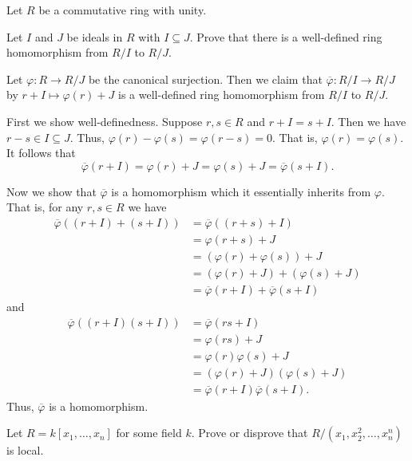 \documentclass[12 pt, letterpaper]{hmcpset}
\begin{document}
Let $R$ be a commutative ring with unity.

\begin{problem}[1.]
	Let $I$ and $J$ be ideals in $R$ with $I \subseteq J$. Prove that there is a well-defined ring homomorphism from $R / I$ to $R / J$.
\end{problem}

\begin{solution}
	Let $\varphi : R \to R / J$ be the canonical surjection. Then we claim that $\overline{\varphi} : R / I \to R / J$ by $r + I \mapsto \varphi(r) + J$ is a well-defined ring homomorphism from $R / I$ to $R / J$. 

	First we show well-definedness. Suppose $r, s \in R$ and $r + I = s + I$. Then we have $r - s \in I \subseteq J$. Thus, $\varphi(r) - \varphi(s) = \varphi(r - s) = 0$. That is, $\varphi(r) = \varphi(s)$. It follows that
	\[
		\overline{\varphi}(r + I) = \varphi(r) + J = \varphi(s) + J = \overline{\varphi}(s + I).
	\]

	Now we show that $\overline{\varphi}$ is a homomorphism which it essentially inherits from $\varphi$. That is, for any $r, s \in R$ we have
	\begin{align*}
		\overline{\varphi}((r + I) + (s + I)) & = \overline{\varphi}((r + s) + I) \\
						      & = \varphi(r + s) + J \\
						      & = (\varphi(r) + \varphi(s)) + J \\
						      & = (\varphi(r) + J) + (\varphi(s) + J) \\
						      & = \overline{\varphi}(r + I) + \overline{\varphi}(s + I)
	\end{align*}
	and
	\begin{align*}
		\overline{\varphi}((r + I) (s + I)) & = \overline{\varphi}(rs + I) \\
						      & = \varphi(rs) + J \\
						      & = \varphi(r) \varphi(s) + J \\
						      & = (\varphi(r) + J) (\varphi(s) + J) \\
						      & = \overline{\varphi}(r + I) \overline{\varphi}(s + I).
	\end{align*}
	Thus, $\overline{\varphi}$ is a homomorphism.

\end{solution}

\pagebreak

\begin{problem}[2.]
	Let $R = k[x_{1}, \dots, x_{n}]$ for some field $k$. Prove or disprove that $R / (x_{1}, x_{2}^{2}, \dots, x_{n}^{n})$ is local.
\end{problem}
\end{document}
